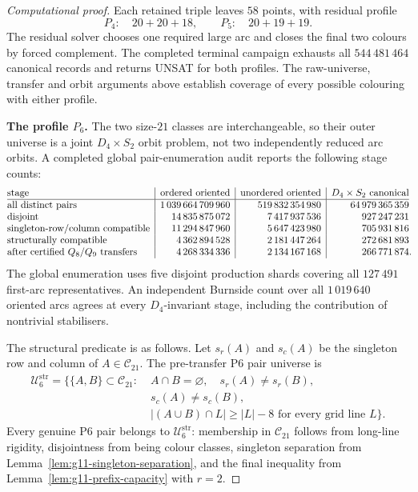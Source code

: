 \documentclass[11pt]{article}
\theoremstyle{definition}
\theoremstyle{remark}
\newcommand{\Dfour}{D_4}
\renewcommand{\ge}{\geqslant}
\begin{document}
\begin{proof}[Computational proof]
Each retained triple leaves \(58\) points, with residual profile
\[
  P_4:\quad20+20+18,
  \qquad
  P_5:\quad20+19+19.
\]
The residual solver chooses one required large arc and closes the final two
colours by forced complement.  The completed terminal campaign exhausts all
\(544\,481\,464\) canonical records and returns UNSAT for both profiles.
The raw-universe, transfer and orbit arguments above establish coverage of
every possible colouring with either profile.

\medskip\noindent\textbf{The profile \(P_6\).}\quad
The two size-\(21\) classes are interchangeable, so their outer universe is a
joint \(\Dfour\times S_2\) orbit problem, not two independently reduced arc
orbits.  A completed global pair-enumeration audit reports the following
stage counts:
{\small
\[
\begin{array}{@{}l|r|r|r@{}}
\text{stage} & \text{ordered oriented} & \text{unordered oriented}
& \Dfour\times S_2\text{ canonical}\\ \hline
\text{all distinct pairs} & 1\,039\,664\,709\,960 & 519\,832\,354\,980 & 64\,979\,365\,359\\
\text{disjoint} & 14\,835\,875\,072 & 7\,417\,937\,536 & 927\,247\,231\\
\text{singleton-row/column compatible} & 11\,294\,847\,960 & 5\,647\,423\,980 & 705\,931\,816\\
\text{structurally compatible} & 4\,362\,894\,528 & 2\,181\,447\,264 & 272\,681\,893\\
\text{after certified }Q_8/Q_9\text{ transfers} & 4\,268\,334\,336 & 2\,134\,167\,168 & 266\,771\,874\rlap{.}
\end{array}
\]
}
The global enumeration uses five disjoint production shards covering all
\(127\,491\) first-arc representatives.  An independent Burnside count over
all \(1\,019\,640\) oriented arcs agrees at every \(\Dfour\)-invariant
stage, including the contribution of nontrivial stabilisers.

The structural predicate is as follows.  Let \(s_r(A)\) and \(s_c(A)\) be the singleton row and column of
\(A\in\mathcal C_{21}\).  The pre-transfer P6 pair universe is
\[
\begin{aligned}
\mathcal U^{\mathrm{str}}_6=\bigl\{\{A,B\}\subset\mathcal C_{21}:\;&
 A\cap B=\varnothing,\quad s_r(A)\ne s_r(B),\\
& s_c(A)\ne s_c(B),\\
& |(A\cup B)\cap L|\ge |L|-8
   \text{ for every grid line }L\bigr\}.
\end{aligned}
\]
Every genuine P6 pair belongs to
\(\mathcal U^{\mathrm{str}}_6\): membership in \(\mathcal C_{21}\) follows from
long-line rigidity, disjointness from being colour classes, singleton
separation from Lemma~\ref{lem:g11-singleton-separation}, and the final
inequality from Lemma~\ref{lem:g11-prefix-capacity} with \(r=2\).


\end{proof}
\end{document}
